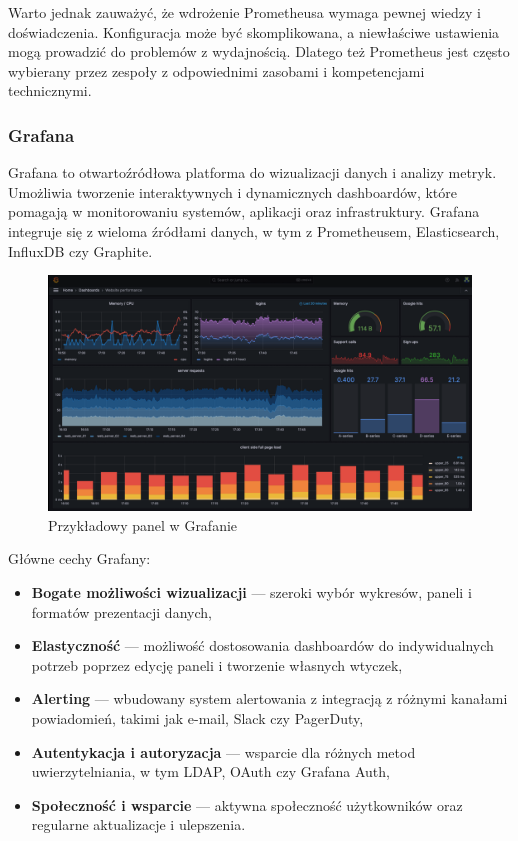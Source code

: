 \documentclass{article}
\begin{document}
Warto jednak zauważyć, że wdrożenie Prometheusa wymaga pewnej wiedzy i doświadczenia. Konfiguracja może być skomplikowana, a niewłaściwe ustawienia mogą prowadzić do problemów z wydajnością. Dlatego też Prometheus jest często wybierany przez zespoły z odpowiednimi zasobami i kompetencjami technicznymi.

\subsubsection{Grafana}

Grafana to otwartoźródłowa platforma do wizualizacji danych i analizy metryk. Umożliwia tworzenie interaktywnych i dynamicznych dashboardów, które pomagają w monitorowaniu systemów, aplikacji oraz infrastruktury. Grafana integruje się z wieloma źródłami danych, w tym z Prometheusem, Elasticsearch, InfluxDB czy Graphite.

\begin{figure}[H]
    \centering
    \includegraphics[width=1\linewidth]{grafanaPrzyklad.png}
    \caption{Przykładowy panel w Grafanie}
    \label{fig:enter-label}
\end{figure}

Główne cechy Grafany:

\begin{itemize}
    \item \textbf{Bogate możliwości wizualizacji} — szeroki wybór wykresów, paneli i formatów prezentacji danych,
    \item \textbf{Elastyczność} — możliwość dostosowania dashboardów do indywidualnych potrzeb poprzez edycję paneli i tworzenie własnych wtyczek,
    \item \textbf{Alerting} — wbudowany system alertowania z integracją z różnymi kanałami powiadomień, takimi jak e-mail, Slack czy PagerDuty,
    \item \textbf{Autentykacja i autoryzacja} — wsparcie dla różnych metod uwierzytelniania, w tym LDAP, OAuth czy Grafana Auth,
    \item \textbf{Społeczność i wsparcie} — aktywna społeczność użytkowników oraz regularne aktualizacje i ulepszenia.
\end{itemize}
\end{document}
